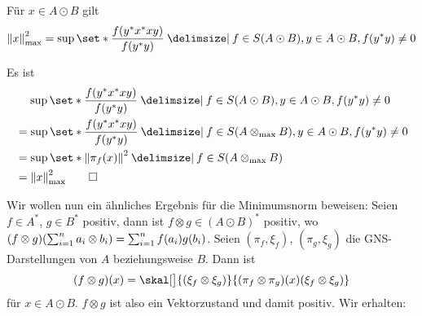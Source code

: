 \begin{satz}
	Für $x \in A \odot B$ gilt
	\[
		\norm*{x}_{\max}^2 = \sup \set*{\frac{f(y^* x^* xy)}{f(y^* y)} \given f \in S(A \odot B) , y \in A \odot B, f(y^* y)\neq 0 }
	\]
\end{satz}
\begin{beweis}
	Es ist
	\begin{align}
		&\hspace{1.14em}\sup \set*{\frac{f(y^* x^* xy)}{f(y^* y)} \given f \in S(A \odot B) , y \in A \odot B, f(y^* y)\neq 0 }\\ 
		&=\sup \set*{\frac{f(y^* x^* xy)}{f(y^* y)} \given f \in S(A \tensormax B) , y \in A \odot B, f(y^* y)\neq 0 } \\
		&= \sup \set*{\norm*{\pi_f(x)}^2 \given f \in S(A \tensormax B)} \\
		&= \norm*{x}_{\max}^2 \qedhere
	\end{align}
\end{beweis}

Wir wollen nun ein ähnliches Ergebnis für die Minimumsnorm beweisen:
Seien $f \in A^*$, $g \in B^*$ positiv, dann ist $f \otimes g \in (A \odot B)^*$ positiv, wo $(f \otimes g) \enbrace*{\sum_{i=1}^{n} a_i \otimes b_i} = \sum_{i=1}^n f(a_i) g(b_i)$.
Seien $(\pi_f,\xi_f)$, $(\pi_g,\xi_g)$ die GNS-Darstellungen von $A$ beziehungsweise $B$.
Dann ist
\[
	(f \otimes g)(x) = \skal[\big]{ \enbrace*{\xi_f \otimes \xi_g} }{(\pi_f \otimes \pi_g)(x) \enbrace*{\xi_f \otimes \xi_g}}
\]
für $x \in A \odot B$.
$f \otimes g$ ist also ein Vektorzustand und damit positiv.
Wir erhalten:

